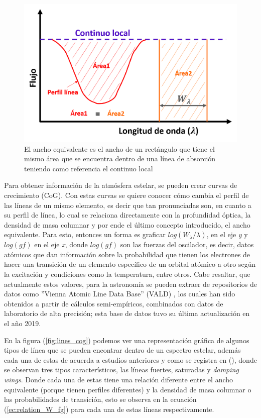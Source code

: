 \documentclass[12pt,oneside,openany,letter]{book}
\begin{document}
\begin{figure}[h]
    \centering
    \includegraphics[width=0.6\linewidth]{Images/we.png}
    \caption{El ancho equivalente es el ancho de un rectángulo que tiene el mismo área que se encuentra dentro de una línea de absorción teniendo como referencia el continuo local}
    \label{fig:my_label}
\end{figure}

\noindent Para obtener información de la atmósfera estelar, se pueden crear curvas de crecimiento (CoG). Con estas curvas se quiere conocer cómo cambia el perfil de las líneas de un mismo elemento, es decir que tan pronunciadas son, en cuanto a su perfil de línea, lo cual se relaciona directamente con la profundidad óptica, la densidad de masa columnar y por ende el último concepto introducido, el ancho equivalente. Para esto, entonces un forma es graficar $log(W_{\lambda}/\lambda)$, en el eje \textit{y} y $log(gf)$ en el eje \textit{x}, donde $log(gf)$ son las fuerzas del oscilador, es decir, datos atómicos que dan información sobre la probabilidad que tienen los electrones de hacer una transición de un elemento específico de un orbital atómico a otro según la excitación y condiciones como la temperatura, entre otros. Cabe resaltar, que actualmente estos valores, para la astronomía se pueden extraer de repositorios de datos como ''Vienna Atomic Line Data Base'' (VALD) \citep{piskunov1995vald}, los cuales han sido obtenidos a partir de cálculos semi-empíricos, combinados con datos de laboratorio de alta precisión; esta base de datos tuvo su última actualización en el año 2019.

En la figura (\ref{fig:lines_cog}) podemos ver una representación gráfica de algunos tipos de línea que se pueden encontrar dentro de un espectro estelar, además cada una de estas de acuerda a estudios anteriores y como se registra en (\cite{carroll2017introduction}), donde se observan tres tipos característicos, las líneas fuertes, saturadas y \textit{damping wings}. Donde cada una de estas tiene una relación diferente entre el ancho equivalente (porque tienen perfiles diferentes) y la densidad de masa columnar o las probabilidades de transición, esto se observa en la ecuación (\ref{ec:relation_W_fg}) para cada una de estas líneas respectivamente.
\end{document}
